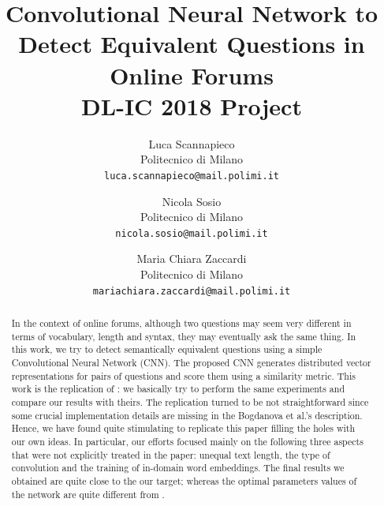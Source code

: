 \documentclass[10pt,twocolumn,letterpaper]{article}
\begin{document}
\title{Convolutional Neural Network to Detect Equivalent Questions in Online Forums  \\ DL-IC 2018 Project} 

\author{Luca Scannapieco\\
Politecnico di Milano\\
{\tt\small luca.scannapieco@mail.polimi.it}
\and
Nicola Sosio\\
Politecnico di Milano\\
{\tt\small nicola.sosio@mail.polimi.it}
\and
Maria Chiara Zaccardi\\
Politecnico di Milano\\
{\tt\small mariachiara.zaccardi@mail.polimi.it}
}

\maketitle

\begin{abstract}
   In the context of online forums, although two questions may seem very different in terms of vocabulary, length and syntax, they may eventually ask the same thing. In this work, we try to detect semantically equivalent questions using a simple Convolutional Neural Network (CNN). The proposed CNN generates distributed vector representations for pairs of questions and score them using a similarity metric. This work is the replication of \cite{bogdanova2015detecting}: we basically try to perform the same experiments and compare our results with theirs. The replication turned to be not straightforward since some crucial implementation details are missing in the Bogdanova et al.'s description. Hence, we have found quite stimulating to replicate this paper filling the holes with our own ideas. In particular, our efforts focused mainly on the following three aspects that were not explicitly treated in the paper: unequal text length, the type of convolution and the training of in-domain word embeddings. The final results we obtained are quite close to the our target; whereas the optimal parameters values of the network are quite different from \cite{bogdanova2015detecting}.
\end{abstract}
\end{document}
